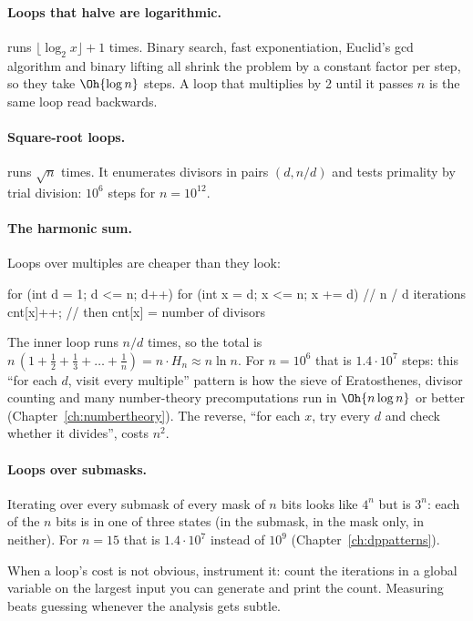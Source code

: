 \paragraph{Loops that halve are logarithmic.}  runs $\lfloor \log_2 x \rfloor + 1$ times. Binary
search, fast exponentiation, Euclid's gcd algorithm and binary lifting all shrink the problem by a constant factor per
step, so they take $\Oh{\log n}$ steps. A loop that multiplies by 2 until it passes $n$ is the same loop read backwards.

\paragraph{Square-root loops.}  runs $\sqrt n$ times. It enumerates divisors in pairs
$(d, n/d)$ and tests primality by trial division: $10^6$ steps for $n = 10^{12}$.

\paragraph{The harmonic sum.} Loops over multiples are cheaper than they look:

\begin{code}
for (int d = 1; d <= n; d++)
    for (int x = d; x <= n; x += d)  // n / d iterations
        cnt[x]++;                     // then cnt[x] = number of divisors
\end{code}

The inner loop runs $n / d$ times, so the total is $n\,(1 + \frac12 + \frac13 + \dots + \frac1n) = n \cdot H_n \approx n
\ln n$. For $n = 10^6$ that is $1.4 \cdot 10^7$ steps: this ``for each $d$, visit every multiple'' pattern is how the sieve
of Eratosthenes, divisor counting and many number-theory precomputations run in $\Oh{n \log n}$ or better
(Chapter~\ref{ch:numbertheory}). The reverse, ``for each $x$, try every $d$ and check whether it divides'', costs $n^2$.

\paragraph{Loops over submasks.} Iterating over every submask of every mask of $n$ bits looks like $4^n$ but is $3^n$: each
of the $n$ bits is in one of three states (in the submask, in the mask only, in neither). For $n = 15$ that is $1.4 \cdot
10^7$ instead of $10^9$ (Chapter~\ref{ch:dppatterns}).

\begin{tip}
When a loop's cost is not obvious, instrument it: count the iterations in a global variable on the largest input you can
generate and print the count. Measuring beats guessing whenever the analysis gets subtle.
\end{tip}

